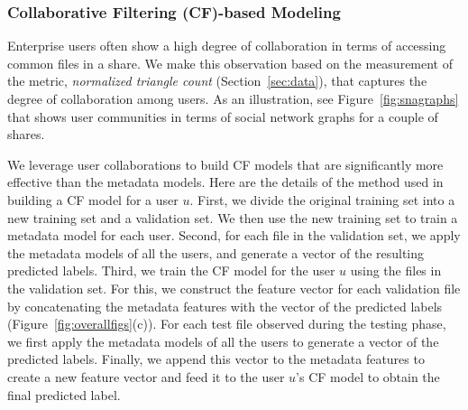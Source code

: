 \subsubsection{Collaborative Filtering (CF)-based Modeling} 
\label{sec:CFdetails}
Enterprise users often show a high degree of collaboration in terms of
accessing common files in a share.  We make this observation based on
the measurement of the metric, \textit{normalized triangle count} 
(Section~\ref{sec:data}), that captures the degree of collaboration
among users.  As an illustration, see Figure~\ref{fig:snagraphs} that
shows user communities in terms of social network graphs for a couple
of shares.

We leverage user collaborations to build CF models that are
significantly more effective than the metadata models.  Here are the
details of the method used in building a CF model for a user $u$.
First, we divide the original training set into a new training set and a
validation set.  We then use the new training set to train a metadata
model for each user.  Second, for each file in the validation set, we
apply the metadata models of all the users, and generate a vector of
the resulting predicted labels.  Third, we train the CF model for the
user $u$ using the files in the validation set.  For this, we
construct the feature vector for each validation file by concatenating
the metadata features with the vector of the predicted labels
(Figure~\ref{fig:overallfigs}(c)).  For each test file observed during
the testing phase, we first apply the metadata models of all the users
to generate a vector of the predicted labels.  Finally, we append this
vector to the metadata features to create a new feature vector and
feed it to the user $u$'s CF model to obtain the final predicted
label.


